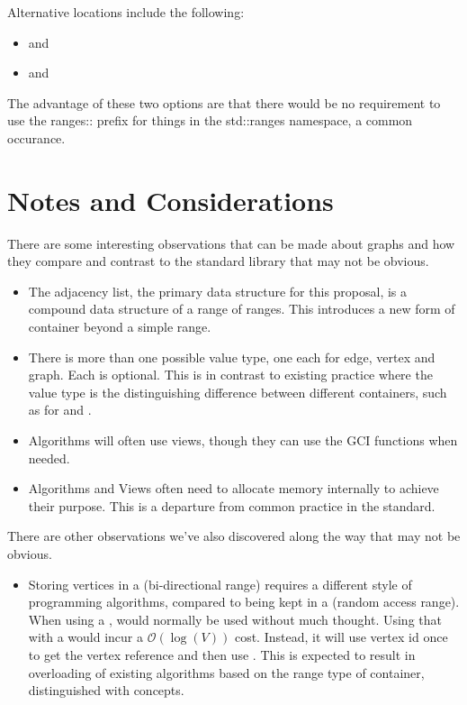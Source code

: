 \noindent
Alternative locations include the following:
\begin{itemize}
\item[] and 
\item[] and 
\end{itemize}
The advantage of these two options are that there would be no requirement to use the ranges:: prefix for things
in the std::ranges namespace, a common occurance.

\section{Notes and Considerations}
There are some interesting observations that can be made about graphs and how they compare and contrast to the 
standard library that may not be obvious.
\begin{itemize}
      \item The adjacency list, the primary data structure for this proposal, is a compound data structure of a
          range of ranges. This introduces a new form of container beyond a simple range.
      \item There is more than one possible value type, one each for edge, vertex and graph. Each is optional.
            This is in contrast to existing practice where the value type is the distinguishing difference between
            different containers, such as for  and .
      \item Algorithms will often use views, though they can use the GCI functions when needed.
      \item Algorithms and Views often need to allocate memory internally to achieve their purpose. This is a departure from
            common practice in the standard.
\end{itemize}

There are other observations we've also discovered along the way that may not be obvious.
\begin{itemize}
      \item Storing vertices in a  (bi-directional range) requires a different style of programming 
            algorithms, compared to being kept in a  (random access range). When using a ,
             would normally be used without much thought. Using that with a  would
            incur a $\mathcal{O}(\log(V))$ cost. Instead, it will use vertex id once to get the vertex reference 
            and then use . This is expected to result in overloading of existing algorithms based on the
            range type of container, distinguished with concepts.
\end{itemize}


